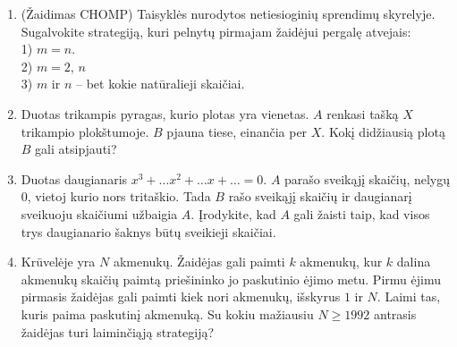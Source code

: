 \begin{enumerate}

\item(Žaidimas CHOMP)
  Taisyklės nurodytos netiesioginių sprendimų skyrelyje. Sugalvokite
  strategiją, kuri pelnytų pirmajam žaidėjui pergalę atvejais: \\
  1) $m=n$. \\
  2) $m=2$, $n$ \\ %
  3) $m$ ir $n$ – bet kokie natūralieji skaičiai.


\item Duotas trikampis pyragas, kurio plotas yra vienetas. $A$ renkasi tašką
  $X$ trikampio plokštumoje. $B$ pjauna tiese, einančia per $X$. Kokį
  didžiausią plotą $B$ gali atsipjauti?


\item Duotas daugianaris $x^3+\dots x^2+\dots x+ \dots=0$. $A$ parašo
  sveikąjį skaičių, nelygų $0$, vietoj kurio nors tritaškio. Tada $B$ rašo
  sveikąjį skaičių ir daugianarį sveikuoju skaičiumi užbaigia $A$.
  Įrodykite, kad $A$ gali žaisti taip, kad visos trys daugianario šaknys būtų
  sveikieji skaičiai.


\item {} Krūvelėje yra $N$ akmenukų.
  Žaidėjas gali paimti $k$ akmenukų, kur $k$ dalina akmenukų skaičių paimtą
  priešininko jo paskutinio ėjimo metu. Pirmu ėjimu pirmasis žaidėjas gali
  paimti kiek nori akmenukų, išskyrus $1$ ir $N$. Laimi tas, kuris paima
  paskutinį akmenuką. Su kokiu mažiausiu $N\geq 1992$ antrasis žaidėjas
  turi laiminčiąją strategiją?


\end{enumerate}
